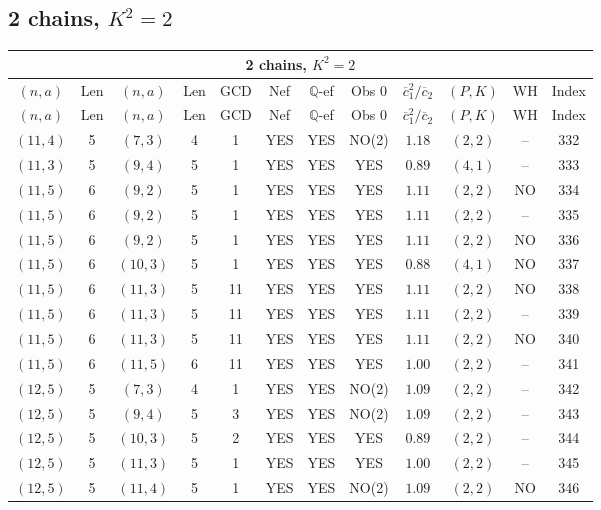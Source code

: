 \subsection{2 chains, $K^2 = 2$}
\begin{longtable}{|c|c|c|c|c|c|c|c|c|c|c|c|}
\hline
\multicolumn{12}{|c|}{2 chains, $K^2 = 2$}\\
\hline
$(n,a)$ & Len & $(n,a)$ & Len & GCD & Nef & $\mathbb Q$-ef & Obs 0 & $\overline c_1^2 / \overline c_2$ & $(P,K)$ & WH & Index\\
\hline
\endfirsthead

\hline
$(n,a)$ & Len & $(n,a)$ & Len & GCD & Nef & $\mathbb Q$-ef & Obs 0 & $\overline c_1^2 / \overline c_2$ & $(P,K)$ & WH & Index\\
\hline
\endhead
\hline
\endfoot

$(11,4)$ & 5 & $(7,3)$ & 4 & 1 & YES & YES & NO(2) & $1.18$ & $(2,2)$ & -- & 332\\
$(11,3)$ & 5 & $(9,4)$ & 5 & 1 & YES & YES & YES & $0.89$ & $(4,1)$ & -- & 333\\
$(11,5)$ & 6 & $(9,2)$ & 5 & 1 & YES & YES & YES & $1.11$ & $(2,2)$ & NO & 334\\
$(11,5)$ & 6 & $(9,2)$ & 5 & 1 & YES & YES & YES & $1.11$ & $(2,2)$ & -- & 335\\
$(11,5)$ & 6 & $(9,2)$ & 5 & 1 & YES & YES & YES & $1.11$ & $(2,2)$ & NO & 336\\
$(11,5)$ & 6 & $(10,3)$ & 5 & 1 & YES & YES & YES & $0.88$ & $(4,1)$ & NO & 337\\
$(11,5)$ & 6 & $(11,3)$ & 5 & 11 & YES & YES & YES & $1.11$ & $(2,2)$ & NO & 338\\
$(11,5)$ & 6 & $(11,3)$ & 5 & 11 & YES & YES & YES & $1.11$ & $(2,2)$ & -- & 339\\
$(11,5)$ & 6 & $(11,3)$ & 5 & 11 & YES & YES & YES & $1.11$ & $(2,2)$ & NO & 340\\
$(11,5)$ & 6 & $(11,5)$ & 6 & 11 & YES & YES & YES & $1.00$ & $(2,2)$ & -- & 341\\
$(12,5)$ & 5 & $(7,3)$ & 4 & 1 & YES & YES & NO(2) & $1.09$ & $(2,2)$ & -- & 342\\
$(12,5)$ & 5 & $(9,4)$ & 5 & 3 & YES & YES & NO(2) & $1.09$ & $(2,2)$ & -- & 343\\
$(12,5)$ & 5 & $(10,3)$ & 5 & 2 & YES & YES & YES & $0.89$ & $(2,2)$ & -- & 344\\
$(12,5)$ & 5 & $(11,3)$ & 5 & 1 & YES & YES & YES & $1.00$ & $(2,2)$ & -- & 345\\
$(12,5)$ & 5 & $(11,4)$ & 5 & 1 & YES & YES & NO(2) & $1.09$ & $(2,2)$ & NO & 346\\

\end{longtable}
